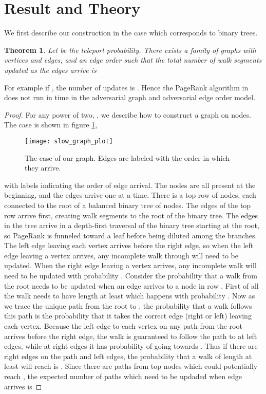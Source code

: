 \documentclass{article}
\newtheorem{thm}{Theorem}
\begin{document}
\section{Result and Theory}
We first describe our construction in the case  which corresponds to binary trees.
\begin{thm} Let  be the teleport probability.  There exists a family of graphs with  vertices and  edges, and an edge order such that the total number of walk segments updated as the edges arrive is 

\end{thm}
For example if , the number of updates is .  Hence the PageRank algorithm in \cite{incremental_pagerank} does not run in time   in the adversarial graph and adversarial edge order model.
\begin{proof} For any power of two, , we describe how to construct a graph on  nodes.  The case  is shown in figure \ref{fig:graph},
  \begin{figure}[tbh]
    \centering
    \texttt{[image: slow\_graph\_plot]}
\caption{The case  of our graph.  Edges are labeled with the order in which they arrive.}
    \label{fig:graph}
  \end{figure}
 with labels indicating the order of edge arrival.  The  nodes are all present at the beginning, and the  edges arrive one at a time.  There is a top row of  nodes, each connected to the root of a balanced binary tree of  nodes.  The edges of the top row arrive first, creating  walk segments to the root of the binary tree.  The edges in the tree arrive in a depth-first traversal of the binary tree starting at the root, so PageRank is funneled toward a leaf before being diluted among the branches.  The left edge leaving each vertex arrives before the right edge, so when the left edge leaving a vertex  arrives, any incomplete walk through   will need to be updated.  When the right edge leaving a vertex  arrives, any incomplete walk will need to be updated with probability .  Consider the probability that a walk from the root needs to be updated when an edge  arrives to a node  in row .  First of all the walk needs to have length at least  which happens with probability .  Now as we trace the unique path from the root to , the probability that a walk follows this path is the probability that it takes the correct edge (right or left) leaving each vertex.  Because the left edge to each vertex on any path from the root arrives before the right edge, the walk is guaranteed to follow the path to  at left edges, while at right edges it has probability  of going towards .  Thus if there are  right edges on the path and  left edges, the probability that a walk of length at least  will reach  is .   Since there are  paths from top nodes which could potentially reach , the expected number of paths which need to be updaded when edge  arrives is



\end{proof}
\end{document}
